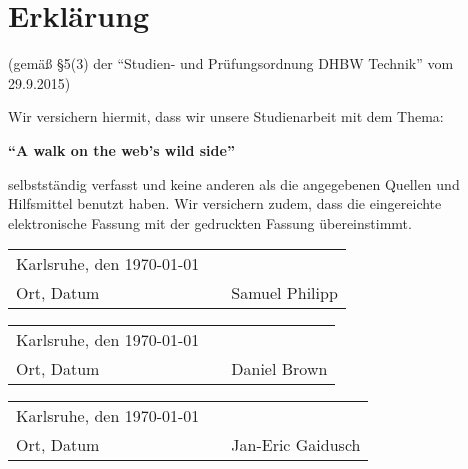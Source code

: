 \chapter*{Erklärung}

\vspace*{2em}

(gemäß §5(3) der \enquote{Studien- und Prüfungsordnung DHBW Technik} vom 29.9.2015)

Wir versichern hiermit, dass wir unsere Studienarbeit mit dem Thema:

\textbf{\enquote{A walk on the web's wild side}}

selbstständig verfasst und keine anderen als die angegebenen Quellen und Hilfsmittel benutzt haben. Wir versichern zudem, dass die eingereichte elektronische Fassung mit der gedruckten Fassung übereinstimmt.

\vspace{3em}

\begin{tabular}{lp{2em}l}
 Karlsruhe, den \today  && \hspace{7cm} \\\cline{1-1}\cline{3-3}
 Ort, Datum     &&  Samuel Philipp
\end{tabular}

\vspace{3em}

\begin{tabular}{lp{2em}l}
 Karlsruhe, den \today  && \hspace{7cm} \\\cline{1-1}\cline{3-3}
 Ort, Datum     &&  Daniel Brown
\end{tabular}

\vspace{3em}

\begin{tabular}{lp{2em}l}
 Karlsruhe, den \today  && \hspace{7cm} \\\cline{1-1}\cline{3-3}
 Ort, Datum     &&  Jan-Eric Gaidusch
\end{tabular}
